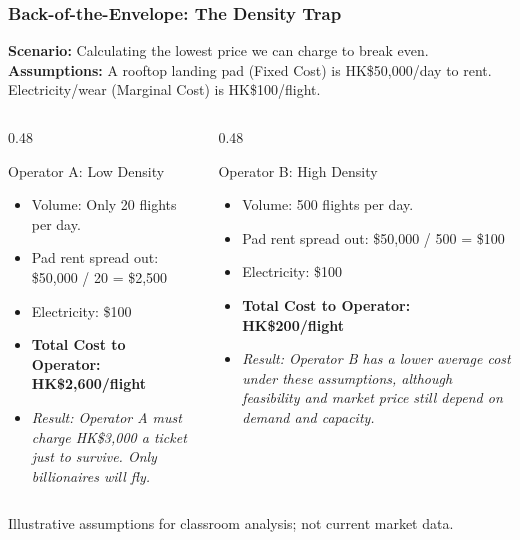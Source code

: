 \documentclass{beamer}
\begin{document}
\begin{frame}[t, shrink=10]
  \frametitle{Back-of-the-Envelope: The Density Trap}
 
  \textbf{Scenario:} Calculating the lowest price we can charge to break even. \\
  \textbf{Assumptions:} A rooftop landing pad (Fixed Cost) is HK\$50,000/day to rent. Electricity/wear (Marginal Cost) is HK\$100/flight.
  \vspace{0.3cm}
  \begin{columns}[T]
    \begin{column}{0.48\textwidth}
      \begin{block}{Operator A: Low Density}
      \begin{itemize}
          \item Volume: Only 20 flights per day.
          \item Pad rent spread out: \$50,000 / 20 = \$2,500
          \item Electricity: \$100
          \item \textbf{Total Cost to Operator: HK\$2,600/flight}
          \item \textit{Result: Operator A must charge HK\$3,000 a ticket just to survive. Only billionaires will fly.}
      \end{itemize}
      \end{block}
    \end{column}
    \begin{column}{0.48\textwidth}
      \begin{block}{Operator B: High Density}
      \begin{itemize}
          \item Volume: 500 flights per day.
          \item Pad rent spread out: \$50,000 / 500 = \$100
          \item Electricity: \$100
          \item \textbf{Total Cost to Operator: HK\$200/flight}
          \item \textit{Result: Operator B has a lower average cost under these assumptions, although feasibility and market price still depend on demand and capacity.}
      \end{itemize}
      \end{block}
    \end{column}
  \end{columns}

\vfill
{\tiny Illustrative assumptions for classroom analysis; not current market data.}
\end{frame}
\end{document}
